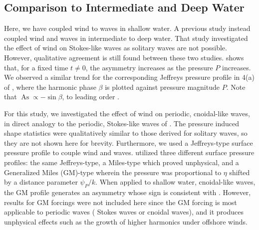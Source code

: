 \documentclass{jfm}
\DeclareMathOperator{\As}{As}
\begin{document}
\subsection{Comparison to Intermediate and Deep Water}
Here, we have coupled wind to waves in shallow water.
A previous study \citep{zdyrski2020wind} instead coupled wind and waves
in intermediate to deep water.
That study investigated the effect of wind on Stokes-like waves as
solitary waves are not possible.
However, qualitative agreement is still found between these two studies.
 shows that, for a fixed time $t \neq 0$,
the asymmetry increases as the pressure $P$ increases.
We observed a similar trend for the corresponding Jeffreys pressure
profile in \figname{} 4(a) of \citet{zdyrski2020wind}, where the
harmonic phase $\beta$ is plotted against pressure magnitude $P$.
Note that $\As \propto -\sin{\beta}$, to leading order \citep[\cf
eq.\ 3.55 of][]{zdyrski2020wind}.

For this study, we investigated the effect of wind on periodic,
cnoidal-like waves, in direct analogy to the periodic, Stokes-like waves
of \citet{zdyrski2020wind}.
The pressure induced shape statistics were qualitatively similar to
those derived for solitary waves, so they are not shown here for
brevity.
Furthermore, we used a Jeffreys-type surface pressure profile to
couple wind and waves.
 utilized three different surface pressure
profiles: the same Jeffreys-type, a Miles-type which proved unphysical,
and a Generalized Miles (GM)-type wherein the pressure was proportional to
$\eta$ shifted by a distance parameter $\psi_P/k$.
When applied to shallow water, cnoidal-like waves, the GM profile
generates an asymmetry whose sign is consistent with
\citet{zdyrski2020wind}.
However, results for GM forcings were not included here since the GM
forcing is most applicable to periodic waves (\eg{} Stokes waves or
cnoidal waves), and it produces unphysical effects such as the growth of
higher harmonics under offshore winds.
\end{document}
